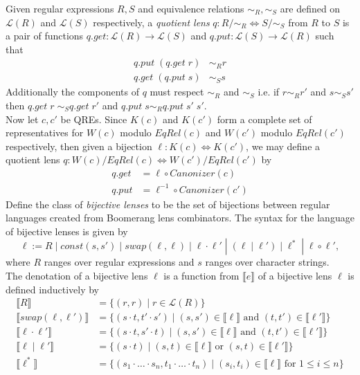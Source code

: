 \documentclass{svproc}
\newcommand{\sep}{\ensuremath{\; | \;}}
\begin{document}
Given regular expressions $R, S$ and equivalence relations $\sim_R, \sim_S$ are
defined on $\mathcal{L}(R)$ and $\mathcal{L}(S)$ respectively, a
\textit{quotient lens} $q :
R/{\sim_R}{\Longleftrightarrow} S/{\sim_S}$ from $R$ to $S$ is
a pair of functions $q.get:
\mathcal{L}(R) \longrightarrow \mathcal{L}(S)$ and $q.put : \mathcal{L}(S)
\longrightarrow \mathcal{L}(R)$ such that
\begin{align*}
q.put \; (q.get \; r) &\sim_R r\\
q.get \; (q.put \; s) &\sim_S s
\end{align*}
Additionally the components of $q$ must respect $\sim_R$ and $\sim_S$ i.e.
if $r \sim_R r'$ and $s \sim_S s'$ then $q.get \; r \; \sim_S q.get \; r'$
and $q.put \; s \sim_R q.put \; s' \; s'$.\\
Now let $c, c'$ be QREs. Since $K(c)$ and $K(c')$ form a complete set of
representatives for $W(c)$ modulo $EqRel(c)$ and $W(c')$ modulo $EqRel(c')$
respectively, then given a bijection $\ell : K(c) \Leftrightarrow K(c')$, we
may define a quotient lens $q : W(c)/EqRel(c) \Leftrightarrow
W(c')/EqRel(c')$ by 
\begin{align*}
q.get &= \ell \circ Canonizer(c)\\
q.put &= \ell^{-1} \circ Canonizer(c')
\end{align*}
Define the class of \textit{bijective
lenses} to be the set of bijections between regular languages created from Boomerang lens combinators.
The syntax for the language of bijective lenses is given by
$$\ell := R \sep const(s, s') \sep  swap(\ell,
\ell) \sep \ell \cdot \ell' \; |  \; (\ell \sep \ell') \sep \ell^* \;
| \; \ell \circ \ell',$$ where $R$ ranges over regular expressions and $s$
ranges over character strings.\\
The denotation of a bijective lens $\ell$ is a function from 
$\llbracket e \rrbracket$ of a bijective lens $\ell$ is defined
inductively by
\begin{align*}
\llbracket R \rrbracket &= \{(r, r) \sep r \in \mathcal{L}(R)\}\\
\llbracket swap(\ell, \ell') \rrbracket &= \{(s \cdot t, t' \cdot s') \sep
(s, s') \in \llbracket \ell \rrbracket \text{ and } (t, t') \in \llbracket
\ell' \rrbracket\}\\
\llbracket \ell \cdot \ell' \rrbracket &= \{(s \cdot t, s' \cdot t) \sep
(s, s') \in \llbracket \ell \rrbracket \text{ and } (t, t') \in \llbracket
\ell' \rrbracket\}\\
\llbracket \ell \sep \ell' \rrbracket &= \{(s \cdot t) \sep
(s, t) \in \llbracket \ell \rrbracket \text{ or } (s, t) \in \llbracket
\ell' \rrbracket\}\\
\llbracket \ell^* \rrbracket &= \{(s_1 \cdot \ldots \cdot s_n, t_1 \cdot \ldots
\cdot t_n) \sep (s_i, t_i) \in \llbracket \ell \rrbracket \text{ for } 1
\leq i \leq n\}
\end{align*}
\end{document}
